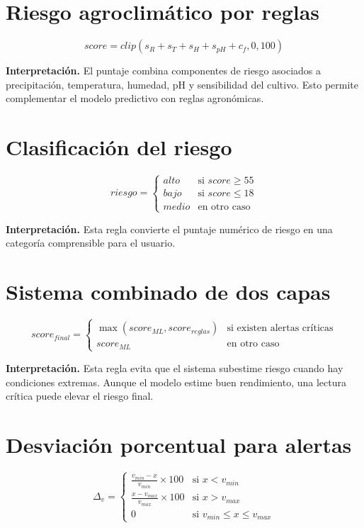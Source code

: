 \documentclass[12pt,letterpaper,oneside]{report}
\begin{document}
\section{Riesgo agroclimático por reglas}
\begin{equation}
score=clip(s_R+s_T+s_H+s_{pH}+c_f,0,100)
\end{equation}

\textbf{Interpretación.} El puntaje combina componentes de riesgo asociados a precipitación, temperatura, humedad, pH y sensibilidad del cultivo. Esto permite complementar el modelo predictivo con reglas agronómicas.

\section{Clasificación del riesgo}
\begin{equation}
riesgo=\begin{cases}
alto & \text{si } score\geq 55 \\
bajo & \text{si } score\leq 18 \\
medio & \text{en otro caso}
\end{cases}
\end{equation}

\textbf{Interpretación.} Esta regla convierte el puntaje numérico de riesgo en una categoría comprensible para el usuario.

\section{Sistema combinado de dos capas}
\begin{equation}
score_{final}=\begin{cases}
\max(score_{ML},score_{reglas}) & \text{si existen alertas críticas} \\
score_{ML} & \text{en otro caso}
\end{cases}
\end{equation}

\textbf{Interpretación.} Esta regla evita que el sistema subestime riesgo cuando hay condiciones extremas. Aunque el modelo estime buen rendimiento, una lectura crítica puede elevar el riesgo final.

\section{Desviación porcentual para alertas}
\begin{equation}
\Delta_v=\begin{cases}
\frac{v_{min}-x}{v_{min}}\times 100 & \text{si } x<v_{min} \\
\frac{x-v_{max}}{v_{max}}\times 100 & \text{si } x>v_{max} \\
0 & \text{si } v_{min}\leq x\leq v_{max}
\end{cases}
\end{equation}
\end{document}
